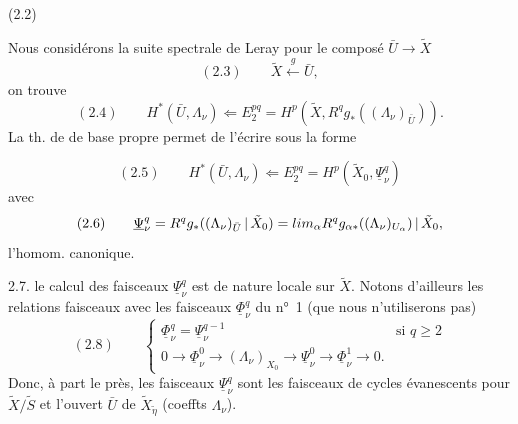 \documentclass[11pt,a4paper]{article}
\begin{document}
(2.2)



Nous considérons la suite spectrale de Leray pour le composé $\bar U \to \tilde X$
\[
(2.3) \qquad \tilde X \xleftarrow{\ g\ } \bar U ,
\]
on trouve
\[
(2.4) \qquad H^*(\bar U, \Lambda_\nu) \Longleftarrow E_2^{pq} = H^p(\tilde X, R^q g_*((\Lambda_\nu)_{\bar U})) .
\]
 La th. de  de base propre permet de l'écrire sous la forme

\[
(2.5) \qquad H^*(\bar U, \Lambda_\nu) \Longleftarrow E_2^{pq} = H^p(\tilde X_0, \underline{\Psi}^q_\nu)
\]
avec
\[
(2.6) \qquad \underline{\Psi}^q_\nu = R^q g_*((\Lambda_\nu)_{\bar U} \,|\, \tilde X_0) = \varinjlim_\alpha R^q g_{\alpha *}((\Lambda_\nu)_{U_\alpha}) \,|\, \tilde X_0 ,
\]
\struck{\ill{}} \ill{} l'homom. canonique.

2.7. \ill{} le calcul des faisceaux $\underline{\Psi}^q_\nu$ est de nature locale sur $\tilde X$. Notons d'ailleurs \struck{\ill{}} les relations \ill{} \ill{} faisceaux avec  les faisceaux $\underline{\Phi}^q_\nu$ du n°~1 (que nous n'utiliserons pas)
\[
(2.8) \qquad
\begin{cases}
\underline{\Phi}^q_\nu = \underline{\Psi}^{q-1}_\nu & \text{si } q \geq 2 \\
0 \to \underline{\Phi}^0_\nu \to (\Lambda_\nu)_{X_0} \to \underline{\Psi}^0_\nu \to \underline{\Phi}^1_\nu \to 0 .
\end{cases}
\]
Donc, à part le  près,  les faisceaux $\underline{\Psi}^q_\nu$ sont les faisceaux de cycles évanescents pour $\tilde X/\tilde S$ et l'ouvert $\bar U$ de $\tilde X_{\tilde\eta}$ (coeffts $\Lambda_\nu$).
\end{document}

